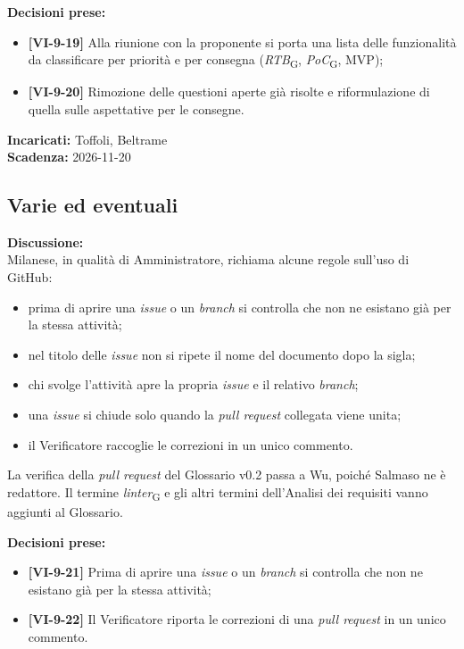 \documentclass[12pt,a4paper]{article}
\newcommand{\vnum}{9}                     %
\newcommand{\gl}[1]{\emph{#1}\textsubscript{\scriptsize G}}       %
\newcommand{\tightlist}{\setlength{\itemsep}{1pt}\setlength{\parskip}{0pt}}
\begin{document}
\textbf{Decisioni prese:}
\begin{itemize}
\tightlist
\item[$\checkmark$] \textbf{[VI-\vnum-19]} Alla riunione con la proponente si porta una lista delle funzionalità da classificare per priorità e per consegna (\gl{RTB}, \gl{PoC}, MVP);
\item[$\checkmark$] \textbf{[VI-\vnum-20]} Rimozione delle questioni aperte già risolte e riformulazione di quella sulle aspettative per le consegne.
\end{itemize}

\textbf{Incaricati:} Toffoli, Beltrame\\
\textbf{Scadenza:} 2026-11-20

\hypertarget{varie-ed-eventuali}{%
\subsection{Varie ed eventuali}}
\textbf{Discussione:}\\
Milanese, in qualità di Amministratore, richiama alcune regole sull'uso di GitHub:
\begin{itemize}
\tightlist
\item prima di aprire una \emph{issue} o un \emph{branch} si controlla che non ne esistano già per la stessa attività;
\item nel titolo delle \emph{issue} non si ripete il nome del documento dopo la sigla;
\item chi svolge l'attività apre la propria \emph{issue} e il relativo \emph{branch};
\item una \emph{issue} si chiude solo quando la \emph{pull request} collegata viene unita;
\item il Verificatore raccoglie le correzioni in un unico commento.
\end{itemize}

La verifica della \emph{pull request} del Glossario v0.2 passa a Wu, poiché Salmaso ne è redattore. Il termine \gl{linter} e gli altri termini dell'Analisi dei requisiti vanno aggiunti al Glossario.

\textbf{Decisioni prese:}
\begin{itemize}
\tightlist
\item[$\checkmark$] \textbf{[VI-\vnum-21]} Prima di aprire una \emph{issue} o un \emph{branch} si controlla che non ne esistano già per la stessa attività;
\item[$\checkmark$] \textbf{[VI-\vnum-22]} Il Verificatore riporta le correzioni di una \emph{pull request} in un unico commento.
\end{itemize}
\end{document}
